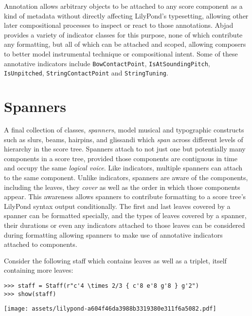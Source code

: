 \noindent Annotation allows arbitrary objects to be attached to any score
component as a kind of metadata without directly affecting LilyPond's
typesetting, allowing other later compositional processes to inspect or react
to those annotations. Abjad provides a variety of indicator classes for this
purpose, none of which contribute any formatting, but all of which can be
attached and scoped, allowing composers to better model instrumental technique
or compositional intent. Some of these annotative indicators include
\texttt{BowContactPoint}, \texttt{IsAtSoundingPitch}, \texttt{IsUnpitched},
\texttt{StringContactPoint} and \texttt{StringTuning}.

\section{Spanners}
\label{sec:spanners}

A final collection of classes, \emph{spanners}, model musical and typographic
constructs such as slurs, beams, hairpins, and glissandi which \emph{span}
across different levels of hierarchy in the score tree. Spanners attach to not
just one but potentially many components in a score tree, provided those
components are contiguous in time and occupy the same \emph{logical voice}.
Like indicators, multiple spanners can attach to the same component. Unlike
indicators, spanners are aware of the components, including the leaves, they
\emph{cover} as well as the order in which those components appear. This
awareness allows spanners to contribute formatting to a score tree's LilyPond
syntax output conditionally. The first and last leaves covered by a spanner can
be formatted specially, and the types of leaves covered by a spanner, their
durations or even any indicators attached to those leaves can be considered
during formatting allowing spanners to make use of annotative indicators
attached to components.

Consider the following staff which contains leaves as well as a triplet, itself
containing more leaves:

\begin{comment}
<abjad>
staff = Staff(r"c'4 \times 2/3 { c'8 e'8 g'8 } g'2")
show(staff)
</abjad>
\end{comment}

\begin{abjadbookoutput}
\begin{singlespacing}
\vspace{-0.5\baselineskip}
\begin{lstlisting}
>>> staff = Staff(r"c'4 \times 2/3 { c'8 e'8 g'8 } g'2")
>>> show(staff)
\end{lstlisting}
\noindent\texttt{[image: assets/lilypond-a604f46da3988b3319380e311f6a5082.pdf]}
\end{singlespacing}
\end{abjadbookoutput}

